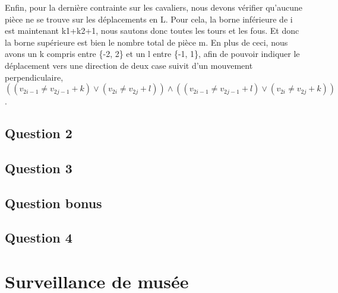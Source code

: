 \documentclass{article}
\begin{document}
Enfin, pour la dernière contrainte sur les cavaliers, nous devons vérifier qu'aucune pièce ne se trouve sur les déplacements en L. Pour cela, la borne inférieure de i est maintenant k1+k2+1, nous sautons donc toutes les tours et les fous. Et donc la borne supérieure est bien le nombre total de pièce m. 
En plus de ceci, nous avons un k compris entre \{-2, 2\} et un l entre \{-1, 1\}, afin de pouvoir indiquer le déplacement vers une direction de deux case suivit d'un mouvement perpendiculaire, $((v_{2i-1} \neq v_{2j-1}+k) \vee  (v_{2i} \neq v_{2j}+l)) \wedge ((v_{2i-1} \neq v_{2j-1}+l) \vee  (v_{2i} \neq v_{2j}+k))$. 

\subsection{Question 2}

\subsection{Question 3}

\subsection{Question bonus}

\subsection{Question 4}

\section{Surveillance de musée}
\end{document}
